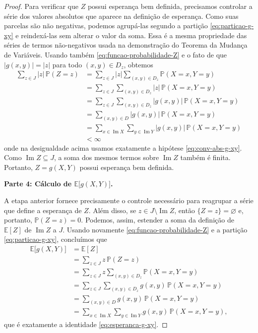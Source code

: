 \documentclass[12pt,portuguese]{article}
\theoremstyle{definition}
\begin{document}
\begin{proof}
Para verificar que $Z$ possui esperança bem definida, precisamos controlar a
série dos valores absolutos que aparece na definição de esperança. Como suas
parcelas são não negativas, podemos agrupá-las segundo a partição
\eqref{eq:particao-g-xy} e reindexá-las sem alterar o valor da soma. Essa é a
mesma propriedade das séries de termos não-negativos usada na demonstração do
Teorema da Mudança de Variáveis. Usando também
\eqref{eq:funcao-probabilidade-Z} e o fato de que $|g(x,y)|=|z|$ para todo
$(x,y)\in D_z$, obtemos
\begin{align*}
\sum_{z\in J}|z|\,\mathbb{P}(Z=z)
&=
\sum_{z\in J}|z|
\sum_{(x,y)\in D_z}\mathbb{P}(X=x,Y=y)
\\[0.3cm]
&=
\sum_{z\in J}\sum_{(x,y)\in D_z}
|z|\,\mathbb{P}(X=x,Y=y)
\\[0.3cm]
&=
\sum_{z\in J}\sum_{(x,y)\in D_z}
|g(x,y)|\,\mathbb{P}(X=x,Y=y)
\\[0.3cm]
&=
\sum_{(x,y)\in D}
|g(x,y)|\,\mathbb{P}(X=x,Y=y)
\\[0.3cm]
&=
\sum_{x\in\operatorname{Im}X}
\sum_{y\in\operatorname{Im}Y}
|g(x,y)|\,\mathbb{P}(X=x,Y=y)
\\[0.3cm]
&<
\infty
\end{align*}
onde na desigualdade acima usamos exatamente a hipótese
\eqref{eq:conv-abs-g-xy}. Como $\operatorname{Im}Z\subseteq J$, a soma dos
mesmos termos sobre $\operatorname{Im}Z$ também é finita. Portanto,
$Z=g(X,Y)$ possui esperança bem definida.

\medskip
\noindent\textbf{Parte 4: Cálculo de $\mathbb{E}\bigl[g(X,Y)\bigr]$.}

A etapa anterior fornece precisamente o controle necessário para reagrupar a
série que define a esperança de $Z$. Além disso, se
$z\in J\setminus\operatorname{Im}Z$, então $\{Z=z\}=\varnothing$ e, portanto,
$\mathbb{P}(Z=z)=0$. Podemos, assim, estender a soma da definição de
$\mathbb{E}[Z]$ de $\operatorname{Im}Z$ a $J$. Usando novamente
\eqref{eq:funcao-probabilidade-Z} e a partição
\eqref{eq:particao-g-xy}, concluímos que
\begin{align*}
\mathbb{E}\bigl[g(X,Y)\bigr]
&=
\mathbb{E}[Z]
\\[0.3cm]
&=
\sum_{z\in J}z\,\mathbb{P}(Z=z)
\\[0.3cm]
&=
\sum_{z\in J}z
\sum_{(x,y)\in D_z}\mathbb{P}(X=x,Y=y)
\\[0.3cm]
&=
\sum_{z\in J}\sum_{(x,y)\in D_z}
g(x,y)\,\mathbb{P}(X=x,Y=y)
\\[0.3cm]
&=
\sum_{(x,y)\in D}
g(x,y)\,\mathbb{P}(X=x,Y=y)
\\[0.3cm]
&=
\sum_{x\in\operatorname{Im}X}
\sum_{y\in\operatorname{Im}Y}
g(x,y)\,\mathbb{P}(X=x,Y=y),
\end{align*}
que é exatamente a identidade \eqref{eq:esperanca-g-xy}.
\end{proof}
\end{document}
